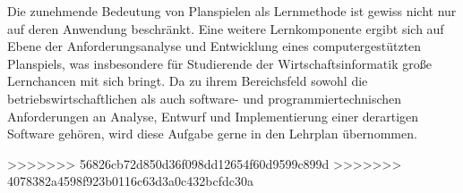 Die zunehmende Bedeutung von Planspielen als Lernmethode ist gewiss nicht nur auf deren Anwendung beschränkt. Eine weitere Lernkomponente ergibt sich auf Ebene der Anforderungsanalyse und Entwicklung eines computergestützten Planspiels, was insbesondere für Studierende der Wirtschaftsinformatik große Lernchancen mit sich bringt. Da zu ihrem Bereichsfeld sowohl die betriebswirtschaftlichen als auch software- und programmiertechnischen Anforderungen an Analyse, Entwurf und Implementierung einer derartigen Software gehören, wird diese Aufgabe gerne in den Lehrplan übernommen.

\autorende{}
>>>>>>> 56826cb72d850d36f098dd12654f60d9599c899d
>>>>>>> 4078382a4598f923b0116c63d3a0c432bcfdc30a
